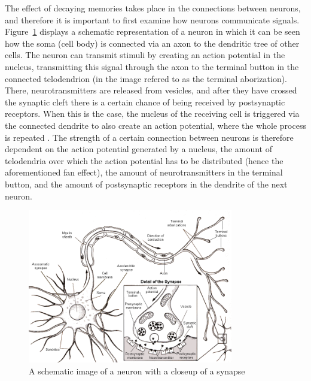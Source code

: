 The effect of decaying memories takes place in the connections between neurons, and therefore it is important to first examine how neurons communicate signals. Figure~\ref{fig:neuron} displays a schematic representation of a neuron in which it can be seen how the soma (cell body) is connected via an axon to the dendritic tree of other cells. The neuron can transmit stimuli by creating an action potential in the nucleus, transmitting this signal through the axon to the terminal button in the connected telodendrion (in the image refered to as the terminal aborization). There, neurotransmitters are released from vesicles, and after they have crossed the synaptic cleft there is a certain chance of being received by postsynaptic receptors. When this is the case, the nucleus of the receiving cell is triggered via the connected dendrite to also create an action potential, where the whole process is repeated \cite{longtermpotentiation}. The strength of a certain connection between neurons is therefore dependent on the action potential generated by a nucleus, the amount of telodendria over which the action potential has to be distributed (hence the aforementioned fan effect), the amount of neurotransmitters in the terminal button, and the amount of postsynaptic receptors in the dendrite of the next neuron.

\begin{figure}
    \centering
    \includegraphics[width=0.8\textwidth]{img/neuron.png}
    \caption{A schematic image of a neuron with a closeup of a synapse \protect\cite{website:neuron}}
    \label{fig:neuron}
\end{figure}

